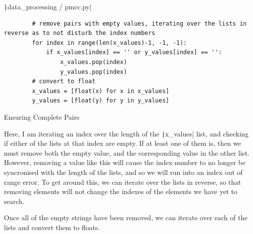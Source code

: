 \documentclass[12pt]{report}
\newcommand{\pil}[1]{\protect\texttt|#1|}
\begin{document}
\begin{listing}[H]
\pil{data_processing / pmcc.py}
\begin{verbatim}
        # remove pairs with empty values, iterating over the lists in reverse as to not disturb the index numbers
        for index in range(len(x_values)-1, -1, -1):
            if x_values[index] == '' or y_values[index] == '':
                x_values.pop(index)
                y_values.pop(index)
        # convert to float
        x_values = [float(x) for x in x_values]
        y_values = [float(y) for y in y_values]
\end{verbatim}
\caption{Ensuring Complete Pairs}\label{cs:completePairs}
\end{listing}

Here, I am iterating an index over the length of the \pil{x_values} list, and checking if either of the lists at that index are empty. If at least one of them is, then we must remove both the empty value, and the corresponding value in the other list. However, removing a value like this will cause the index number to no longer be syncronised with the length of the lists, and so we will run into an index out of range error. To get around this, we can iterate over the lists in reverse, so that removing elements will not change the indexes of the elements we have yet to search.

Once all of the empty strings have been removed, we can iterate over each of the lists and convert them to floats.

\begin{center}
\end{center}
\end{document}
